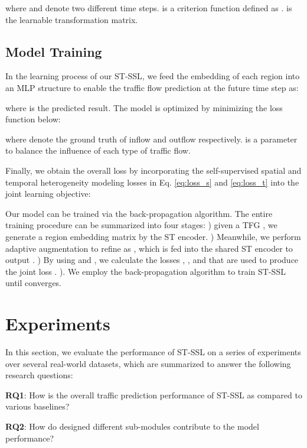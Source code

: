 \documentclass[letterpaper]{article} \usepackage{aaai23}  \usepackage{times}  \usepackage{helvet}  \usepackage{courier}  \usepackage[hyphens]{url}  \usepackage{graphicx} \urlstyle{rm} \def\UrlFont{\rm}  \usepackage{natbib}  \usepackage{caption} \frenchspacing  \setlength{\pdfpagewidth}{8.5in} \setlength{\pdfpageheight}{11in}
\newcommand{\bitem}[1]{\noindent \textbf{#1}}
\newcommand{\name}{ST-SSL\xspace}
\begin{document}
\noindent where  and  denote two different time steps.  is a criterion function defined as .  is the learnable transformation matrix.







\subsection{Model Training}

In the learning process of our \name, we feed the embedding  of each region  into an MLP structure to enable the traffic flow prediction at the future time step  as:

\noindent where  is the predicted result. The model is optimized by minimizing the loss function below:

where  denote the ground truth of inflow and outflow respectively.  is a parameter to balance the influence of each type of traffic flow.



Finally, we obtain the overall loss by incorporating the self-supervised spatial and temporal heterogeneity modeling losses in Eq. \eqref{eq:loss_s} and \eqref{eq:loss_t} into the joint learning objective:


Our model can be trained via the back-propagation algorithm. The entire training procedure can be summarized into four stages: ) given a TFG , we generate a region embedding matrix  by the ST encoder. ) Meanwhile, we perform adaptive augmentation to refine  as , which is fed into the shared ST encoder to output . ) By using  and , we calculate the losses , , and  that are used to produce the joint loss . ). We employ the back-propagation algorithm to train \name until  converges.

\section{Experiments}\label{sec:expt}

In this section, we evaluate the performance of \name on a series of experiments over several real-world datasets, which are summarized to answer the following research questions:

\bitem{RQ1}: How is the overall traffic prediction performance of \name as compared to various baselines?

\bitem{RQ2}: How do designed different sub-modules contribute to the model performance?
\end{document}
